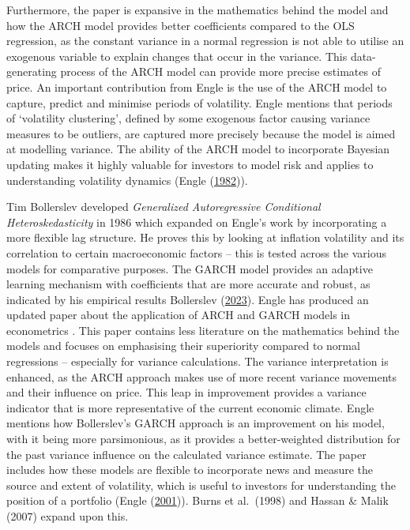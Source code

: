 \documentclass[11pt,preprint, authoryear]{elsarticle}
\numberwithin{equation}{section}
\numberwithin{figure}{section}
\numberwithin{table}{section}
\begin{document}
Furthermore, the paper is expansive in the mathematics behind the model
and how the ARCH model provides better coefficients compared to the OLS
regression, as the constant variance in a normal regression is not able
to utilise an exogenous variable to explain changes that occur in the
variance. This data-generating process of the ARCH model can provide
more precise estimates of price. An important contribution from Engle is
the use of the ARCH model to capture, predict and minimise periods of
volatility. Engle mentions that periods of `volatility clustering',
defined by some exogenous factor causing variance measures to be
outliers, are captured more precisely because the model is aimed at
modelling variance. The ability of the ARCH model to incorporate
Bayesian updating makes it highly valuable for investors to model risk
and applies to understanding volatility dynamics (Engle
(\protect\hyperlink{ref-EngleRobertF.1982ACHw}{1982})).

Tim Bollerslev developed \emph{Generalized Autoregressive Conditional
Heteroskedasticity} in 1986 which expanded on Engle's work by
incorporating a more flexible lag structure. He proves this by looking
at inflation volatility and its correlation to certain macroeconomic
factors -- this is tested across the various models for comparative
purposes. The GARCH model provides an adaptive learning mechanism with
coefficients that are more accurate and robust, as indicated by his
empirical results Bollerslev
(\protect\hyperlink{ref-BollerslevTim2023RoGA}{2023}). Engle has
produced an updated paper about the application of ARCH and GARCH models
in econometrics . This paper contains less literature on the mathematics
behind the models and focuses on emphasising their superiority compared
to normal regressions -- especially for variance calculations. The
variance interpretation is enhanced, as the ARCH approach makes use of
more recent variance movements and their influence on price. This leap
in improvement provides a variance indicator that is more representative
of the current economic climate. Engle mentions how Bollerslev's GARCH
approach is an improvement on his model, with it being more
parsimonious, as it provides a better-weighted distribution for the past
variance influence on the calculated variance estimate. The paper
includes how these models are flexible to incorporate news and measure
the source and extent of volatility, which is useful to investors for
understanding the position of a portfolio (Engle
(\protect\hyperlink{ref-EngleRobert2001G1TU}{2001})). Burns et
al.~(1998) and Hassan \& Malik (2007) expand upon this.
\end{document}
